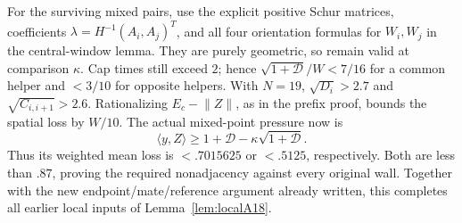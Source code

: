\documentclass[11pt]{article}
\theoremstyle{definition}
\theoremstyle{remark}
\newcommand{\ip}[2]{\langle #1,#2\rangle}
\newcommand{\norm}[1]{\lVert #1\rVert}
\begin{document}
For the surviving mixed pairs, use the explicit
positive Schur matrices, coefficients
\(\lambda=H^{-1}(A_i,A_j)^T\), and all four
orientation formulas for \(W_i,W_j\) in the
central-window lemma. They are purely geometric,
so remain valid at comparison \(\kappa\).
Cap times still exceed \(2\); hence
\(\sqrt{1+\mathcal D}/W<7/16\) for a common
helper and \(<3/10\) for opposite helpers.
With \(N=19\), \(\sqrt{D_i}>2.7\) and
\(\sqrt{C_{i,i+1}}>2.6\).
Rationalizing \(E_c-\norm Z\), as in the
prefix proof, bounds the spatial loss by \(W/10\).
The actual mixed-point pressure now is
\[
 \ip{y}{Z}\geq
  1+\mathcal D-\kappa\sqrt{1+\mathcal D}.
\]
Thus its weighted mean loss is \(<.7015625\)
or \(<.5125\), respectively.
Both are less than \(.87\), proving the
required nonadjacency against every original wall.
Together with the new endpoint/mate/reference
argument already written, this completes all
earlier local inputs of Lemma~\ref{lem:localA18}.
\end{document}

